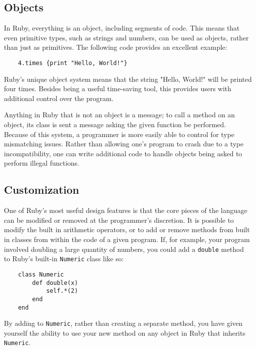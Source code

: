 \documentclass[12pt]{article}
\begin{document}
\subsection{Objects}
In Ruby, everything is an object, including segments of code\cite{generalRb}. This means that even primitive types, such as strings and numbers, can be used as objects, rather than just as primitives. The following code provides an excellent example:
\begin{lstlisting}
	4.times {print "Hello, World!"}
\end{lstlisting}
Ruby's unique object system means that the string "Hello, World!" will be printed four times. Besides being a useful time-saving tool, this provides users with additional control over the program.

Anything in Ruby that is not an object is a message; to call a method on an object, its class is sent a message asking the given function be performed. Because of this system, a programmer is more easily able to control for type mismatching issues. Rather than allowing one's program to crash due to a type incompatibility, one can write additional code to handle objects being asked to perform illegal functions.

\subsection{Customization}
One of Ruby's most useful design features is that the core pieces of the language can be modified or removed at the programmer's discretion. It is possible to modify the built in arithmetic operators, or to add or remove methods from built in classes from within the code of a given program. If, for example, your program involved doubling a large quantity of numbers, you could add a \verb|double| method to Ruby's built-in \verb|Numeric| class like so:
\begin{lstlisting}
    class Numeric
        def double(x)
            self.*(2)
        end
    end
\end{lstlisting}
By adding to \verb|Numeric|, rather than creating a separate method, you have given yourself the ability to use your new method on any object in Ruby that inherits \verb|Numeric|.
\end{document}
